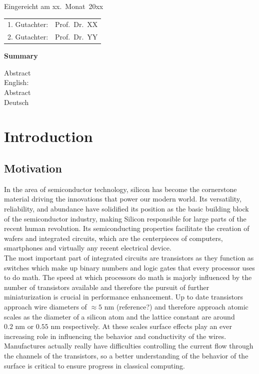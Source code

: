 	
	\thispagestyle{empty}\vspace*{48em}
	
	Eingereicht am xx.~Monat~20xx\vspace{1.5em}
	\par{\large\begin{tabular}{ll}
			1. Gutachter: & Prof.~Dr.~XX \\
			2. Gutachter: & Prof.~Dr.~YY \\
	\end{tabular}}
	
	
	\newpage
	\begin{center}\large\bfseries Summary\end{center}
	
	
	Abstract \\ 
	English: \\
	
	\vspace{20em}
	Abstract \\ 
	Deutsch \\
	
	
	
	\tableofcontents
	
	
	
	\mainmatter
	\chapter{Introduction}
	\section{Motivation}
	In the area of semiconductor technology, silicon has become the cornerstone material driving the innovations that power our modern world. Its versatility, reliability, and abundance have solidified its position as the basic building block of the semiconductor industry, making Silicon responsible for large parts of the recent human revolution. Its semiconducting properties facilitate the creation of wafers and integrated circuits, which are the centerpieces of computers, smartphones and virtually any recent electrical device. \\
	
	The most important part of integrated circuits are transistors as they function as switches which make up binary numbers and logic gates that every processor uses to do math. The speed at which processors do math is majorly influenced by the number of transistors available and therefore the pursuit of further miniaturization is crucial in performance enhancement. Up to date transistors approach wire diameters of  $\approx 5\text{ nm}$ (reference?) and therefore approach atomic scales as the diameter of a silicon atom and the lattice constant are around $0.2\text{ nm}$ or $0.55 \text{ nm}$ respectively. At these scales surface effects play an ever increasing role in influencing the behavior and conductivity of the wires. Manufactures actually really have difficulties controlling the current flow through the channels of the transistors, so a better understanding of the behavior of the surface is critical to ensure progress in classical computing. \\
	
